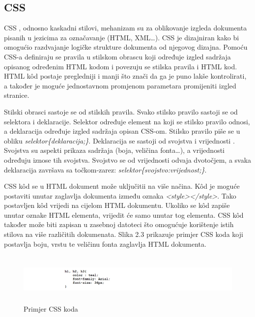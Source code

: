 \documentclass[times, utf8, zavrsni, numeric]{fer}
\begin{document}
\subsection{CSS}
CSS , odnosno kaskadni stilovi, mehanizam su za oblikovanje izgleda dokumenta pisanih u jezicima za označavanje (HTML, XML\ldots). CSS je dizajniran kako bi omogućio razdvajanje logičke strukture dokumenta od njegovog dizajna. Pomoću CSS-a definiraju se pravila u stilskom obrascu koji određuje izgled sadržaja opisanog određenim HTML kodom i povezuju se stilska pravila i HTML kod.  HTML kôd postaje pregledniji i manji što znači da ga je puno lakše kontrolirati, a također je moguće jednostavnom promjenom parametara promijeniti izgled stranice.

Stilski obrasci sastoje se od stilskih pravila. Svako stilsko pravilo sastoji se od selektora i deklaracije. Selektor određuje element na koji se stilsko pravilo odnosi, a deklaracija određuje izgled sadržaja opisan CSS-om. Stilsko pravilo piše se u obliku \emph{selektor\{deklaracija;\}}. Deklaracija se sastoji od svojstva  i vrijednosti . Svojstva su aspekti prikaza sadržaja (boja, veličina fonta\ldots), a vrijednosti određuju iznose tih svojstva. Svojstvo se od vrijednosti odvaja dvotočjem, a svaka deklaracija završava sa točkom-zarez: \emph{selektor\{svojstvo:vrijednost;\}}. 

CSS kôd se u HTML dokument može uključitii na više načina. Kôd je moguće postaviti unutar zaglavlja dokumenta između oznaka \emph{<style></style>}. Tako postavljen kôd vrijedi na cijelom HTML dokumentu. Ukoliko se kôd zapiše unutar oznake HTML elementa, vrijedit će samo unutar tog elementa. CSS kôd također može biti zapisan u zasebnoj datoteci što omogućuje korištenje istih stilova na više različitih dokumenata. Slika 2.3 prikazuje primjer CSS koda koji postavlja boju, vrstu te veličinu fonta zaglavlja HTML dokumenta.
\begin{figure}[htb]
\centering
\includegraphics[height=2.5cm]{css-example.png}
\caption{Primjer CSS koda}
\label{fig:basicCss}
\end{figure}
\end{document}
